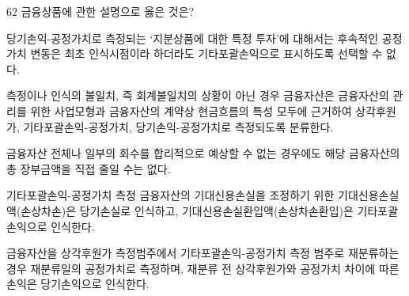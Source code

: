 \begin{question}{62}
금융상품에 관한 설명으로 옳은 것은?
\begin{choices}
  \item 당기손익-공정가치로 측정되는 ‘지분상품에 대한 특정 투자’에 대해서는 후속적인 공정가치 변동은 최초 인식시점이라 하더라도 기타포괄손익으로 표시하도록 선택할 수 없다.
  \item 측정이나 인식의 불일치, 즉 회계불일치의 상황이 아닌 경우 금융자산은 금융자산의 관리를 위한 사업모형과 금융자산의 계약상 현금흐름의 특성 모두에 근거하여 상각후원가, 기타포괄손익-공정가치, 당기손익-공정가치로 측정되도록 분류한다.
  \item 금융자산 전체나 일부의 회수를 합리적으로 예상할 수 없는 경우에도 해당 금융자산의 총 장부금액을 직접 줄일 수는 없다.
  \item 기타포괄손익-공정가치 측정 금융자산의 기대신용손실을 조정하기 위한 기대신용손실액(손상차손)은 당기손실로 인식하고, 기대신용손실환입액(손상차손환입)은 기타포괄손익으로 인식한다.
  \item 금융자산을 상각후원가 측정범주에서 기타포괄손익-공정가치 측정 범주로 재분류하는 경우 재분류일의 공정가치로 측정하며, 재분류 전 상각후원가와 공정가치 차이에 따른 손익은 당기손익으로 인식한다.
\end{choices}
\end{question}
